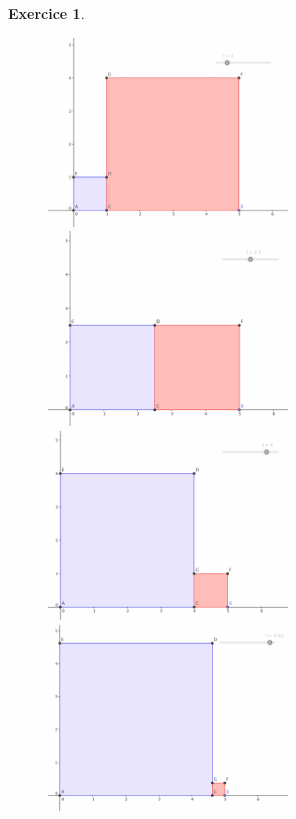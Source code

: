 \documentclass[a4paper,10pt]{article}
\theoremstyle{definition}
\theoremstyle{definition}
\newtheorem*{exo}{Exercice}
\begin{document}
\begin{exo}
\begin{figure}[h!]
	\begin{minipage}[c]{.5\textwidth}
		\centering
		\includegraphics[width=2.5in]{EXO_2_1.jpg}
		\caption{}
		\label{fig1}
		\includegraphics[width=2.5in]{EXO_2_2.jpg}
		\caption{}
		\label{fig2}
	\end{minipage}
\hfill
\begin{minipage}[c]{.5\textwidth}
	\centering
	\includegraphics[width=2.5in]{EXO_2_3.jpg}
	\caption{}
	\label{fig3}
	\includegraphics[width=2.5in]{EXO_2_4.jpg}
	\caption{}

\end{minipage}
\end{figure}
\end{exo}
\end{document}
